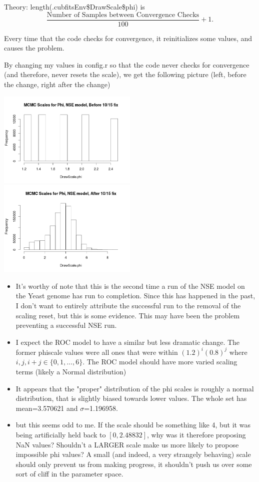 Theory: length(.cubfitsEnv\$DrawScale\$phi) is $$\frac{\mbox{Number of Samples between Convergence Checks}}{100} + 1.$$

Every time that the code checks for convergence, it reinitializes some values, and causes the problem.

By changing my values in config.r so that the code never checks for convergence (and therefore, never resets the scale), we get the following picture (left, before the change, right after the change)

\includegraphics[width=0.5\textwidth]{data/oct15-phiscales-before_change.png}
\includegraphics[width=0.5\textwidth]{data/oct15-phiscales-after_change.png}

\begin{itemize}
\item It's worthy of note that this is the second time a run of the NSE model on the Yeast genome has run to completion. Since this has happened in the past, I don't want to entirely attribute the successful run to the removal of the scaling reset, but this is some evidence. This may have been the problem preventing a successful NSE run.

\item I expect the ROC model to have a similar but less dramatic change. The former phiscale values were all ones that were within $(1.2)^i(0.8)^j$ where $i, j, i+j \in \{0, 1,...,6\}$. The ROC model should have more varied scaling terms (likely a Normal distribution)

\item It appears that the "proper" distribution of the phi scales is roughly a normal distribution, that is slightly biased towards lower values. The whole set has mean=3.570621 and $\sigma$=1.196958.


\item but this seems odd to me. If the scale should be something like 4, but it was being artificially held back to $[0,2.48832]$, why was it therefore proposing NaN values? Shouldn't a LARGER scale make us more likely to propose impossible phi values? A small (and indeed, a very strangely behaving) scale should only prevent us from making progress, it shouldn't push us over some sort of cliff in the parameter space.
\end{itemize}

